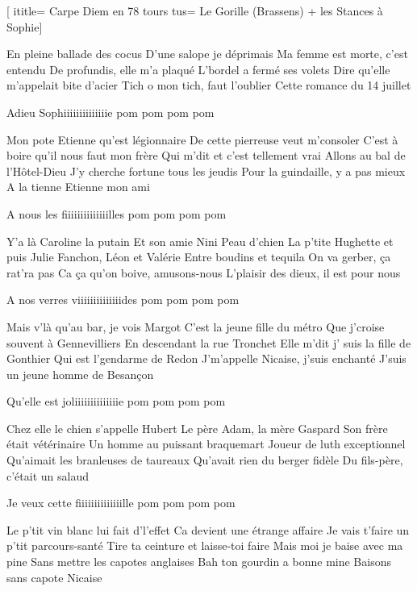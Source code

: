  [
ititle= {Carpe Diem en 78 tours}
tus= {Le Gorille (Brassens) + les Stances à Sophie}]


\beginverse
En pleine ballade des cocus
D’une salope je déprimais
Ma femme est morte, c’est entendu
De profundis, elle m’a plaqué
L’bordel a fermé ses volets
Dire qu’elle m’appelait bite d’acier
Tich o mon tich, faut l’oublier
Cette romance du 14 juillet
\endverse

\beginchorus
Adieu Sophiiiiiiiiiiiiiie pom pom pom pom
\endchorus

\beginverse
Mon pote Etienne qu’est légionnaire
De cette pierreuse veut m’consoler
C’est à boire qu’il nous faut mon frère
Qui m’dit et c’est tellement vrai
Allons au bal de l’Hôtel-Dieu
J’y cherche fortune tous les jeudis
Pour la guindaille, y a pas mieux
A la tienne Etienne mon ami
\endverse

\beginchorus
A nous les fiiiiiiiiiiiiiilles pom pom pom pom
\endchorus

\beginverse
Y’a là Caroline la putain
Et son amie Nini Peau d’chien
La p’tite Hughette et puis Julie
Fanchon, Léon et Valérie
Entre boudins et tequila
On va gerber, ça rat’ra pas
Ca ça qu’on boive, amusons-nous
L’plaisir des dieux, il est pour nous
\endverse

\beginchorus
A nos verres viiiiiiiiiiiiiides pom pom pom pom
\endchorus

\beginverse
Mais v’là qu’au bar, je vois Margot
C’est la jeune fille du métro
Que j’croise souvent à Gennevilliers
En descendant la rue Tronchet
Elle m’dit j’ suis la fille de Gonthier
Qui est l’gendarme de Redon
J’m’appelle Nicaise, j’suis enchanté
J’suis un jeune homme de Besançon
\endverse

\beginchorus
Qu’elle est joliiiiiiiiiiiiiie pom pom pom pom
\endchorus

\beginverse
Chez elle le chien s’appelle Hubert
Le père Adam, la mère Gaspard
Son frère était vétérinaire
Un homme au puissant braquemart
Joueur de luth exceptionnel
Qu’aimait les branleuses de taureaux
Qu’avait rien du berger fidèle
Du fils-père, c’était un salaud
\endverse

\beginchorus
Je veux cette fiiiiiiiiiiiiiille pom pom pom pom
\endchorus

\beginverse
Le p’tit vin blanc lui fait d’l’effet
Ca devient une étrange affaire
Je vais t’faire un p’tit parcours-santé
Tire ta ceinture et laisse-toi faire
Mais moi je baise avec ma pine
Sans mettre les capotes anglaises
Bah ton gourdin a bonne mine
Baisons sans capote Nicaise
\endverse

